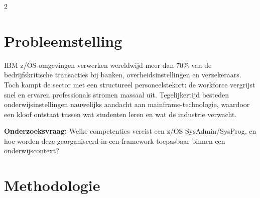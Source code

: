 \documentclass[a0,portrait]{hogent-poster}
\begin{document}
\begin{multicols}{2}

\section{Probleemstelling}

IBM z/OS-omgevingen verwerken wereldwijd meer dan 70\% van de bedrijfskritische transacties bij banken, overheidsinstellingen en verzekeraars. Toch kampt de sector met een structureel personeelstekort: de workforce vergrijst snel en ervaren professionals stromen massaal uit. Tegelijkertijd besteden onderwijsinstellingen nauwelijks aandacht aan mainframe-technologie, waardoor een kloof ontstaat tussen wat studenten leren en wat de industrie verwacht.

\textbf{Onderzoeksvraag:} Welke competenties vereist een z/OS SysAdmin/SysProg, en hoe worden deze georganiseerd in een framework toepasbaar binnen een onderwijscontext?

\section{Methodologie}

\begin{center}
\end{center}
\end{multicols}
\end{document}
